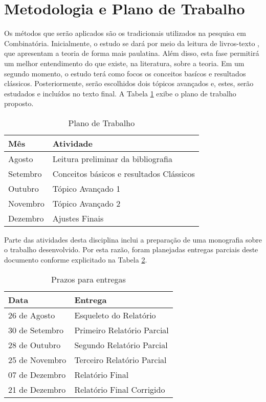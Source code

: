 
\section*{Metodologia e Plano de Trabalho}

Os métodos que serão aplicados são os tradicionais utilizados na pesquisa em Combinatória. Inicialmente, o estudo se dará por meio da leitura de livros-texto \cite{alon, bollobas, bondy, diestel, graham, graham_rudiments, nesetril}, que apresentam a teoria de forma mais paulatina. Além disso, esta fase permitirá um melhor entendimento do que existe, na literatura, sobre a teoria. Em um segundo momento, o estudo terá como focos os conceitos basícos e resultados clássicos. Posteriormente, serão escolhidos dois tópicos avançados e, estes, serão estudados e incluídos no texto final. A Tabela \ref{tab:plano} exibe o plano de  trabalho proposto.

\begin{table}[h!]
\centering
\caption{Plano de Trabalho}
\label{tab:plano}
\begin{tabular}{|l|l|}
\hline
Mês      & Atividade                                \\\hline\hline
Agosto   & Leitura preliminar da bibliografia       \\
Setembro & Conceitos básicos e resultados Clássicos \\
Outubro  & Tópico Avançado 1                        \\
Novembro & Tópico Avançado 2                        \\
Dezembro & Ajustes Finais                           \\\hline
\end{tabular}
\end{table}

Parte das atividades desta disciplina inclui a preparação de uma monografia sobre o trabalho desenvolvido. Por esta razão, foram planejadas entregas parciais deste documento conforme explicitado na Tabela \ref{tab:prazo}.

\begin{table}[h!]
\centering
\caption{Prazos para entregas}
\label{tab:prazo}
\begin{tabular}{|l|l|}
\hline
Data           & Entrega                    \\\hline\hline
26 de Agosto   & Esqueleto do Relatório     \\
30 de Setembro & Primeiro Relatório Parcial \\
28 de Outubro  & Segundo Relatório Parcial  \\
25 de Novembro & Terceiro Relatório Parcial \\
07 de Dezembro & Relatório Final            \\
21 de Dezembro & Relatório Final Corrigido  \\\hline
\end{tabular}
\end{table}

